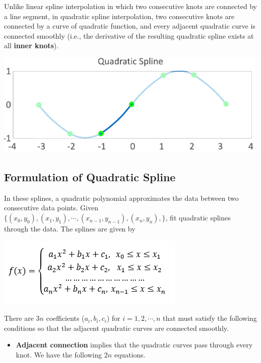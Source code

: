 \documentclass[
]{book}
\providecommand{\tightlist}{%
  \setlength{\itemsep}{0pt}\setlength{\parskip}{0pt}}
\begin{document}
Unlike linear spline interpolation in which two consecutive knots are connected by a line segment, in quadratic spline interpolation, two consecutive knots are connected by a curve of quadratic function, and every adjacent quadratic curve is connected smoothly (i.e., the derivative of the resulting quadratic spline exists at all \textbf{inner knots}).

\hfill\break

\begin{center}\includegraphics[width=0.55\linewidth]{img10/08-quadratidSpline} \end{center}

\hypertarget{formulation-of-quadratic-spline}{%
\subsection{Formulation of Quadratic Spline}\label{formulation-of-quadratic-spline}}

\hfill\break

In these splines, a quadratic polynomial approximates the data between two consecutive data points. Given \(\{(x_0, y_0), (x_1, y_1), \cdots, (x_{n-1}, y_{n-1}),(x_{n}, y_{n}), \}\), fit quadratic splines through the data. The splines are given by

\begin{center}\includegraphics[width=0.45\linewidth]{img10/08-quadraticSplineFun} \end{center}

There are \(3n\) coefficients (\(a_i, b_i, c_i\)) for \(i = 1, 2, \cdots, n\) that must satisfy the following conditions so that the adjacent quadratic curves are connected smoothly.

\begin{itemize}
\tightlist
\item
  \textbf{Adjacent connection} implies that the quadratic curves pass through every knot. We have the following \(2n\) equations.
\end{itemize}
\end{document}
